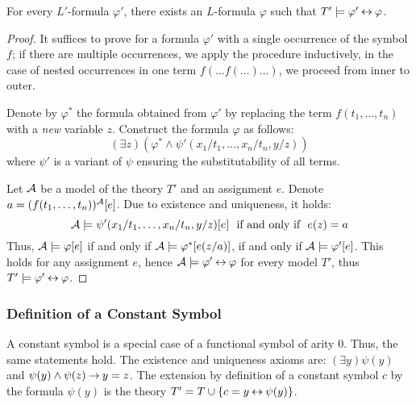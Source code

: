 \begin{proposition}
    For every $L'$-formula $\varphi'$, there exists an $L$-formula $\varphi$ such that $T'\models\varphi'\mathbin{\leftrightarrow}\varphi$.
\end{proposition}
\begin{proof}
    It suffices to prove for a formula $\varphi'$ with a single occurrence of the symbol $f$; if there are multiple occurrences, we apply the procedure inductively, in the case of nested occurrences in one term $f(\dots f(\dots)\dots)$, we proceed from inner to outer.

    Denote by $\varphi^*$ the formula obtained from $\varphi'$ by replacing the term $f(t_1,\dots,t_n)$ with a \emph{new} variable $z$. Construct the formula $\varphi$ as follows:
    $$
    (\exists z)(\varphi^*\land \psi'(x_1/t_1,\dots,x_n/t_n,y/z))
    $$
    where $\psi'$ is a variant of $\psi$ ensuring the substitutability of all terms.

    Let $\mathcal{A}$ be a model of the theory $T'$ and an assignment $e$. Denote $a=(f(t_1,\dots,t_n))^{\mathcal{A}}[e]$. Due to existence and uniqueness, it holds:
    $$
    \A\models\psi'(x_1/t_1,\dots,x_n/t_n,y/z)[e]\ \text{ if and only if }\ e(z)=a 
    $$
    Thus, $\mathcal{A}\models\varphi[e]$ if and only if $\mathcal{A}\models\varphi^*[e(z/a)]$, if and only if $\mathcal{A}\models\varphi'[e]$. This holds for any assignment $e$, hence $\mathcal{A}\models\varphi'\mathbin{\leftrightarrow}\varphi$ for every model $T'$, thus $T'\models\varphi'\mathbin{\leftrightarrow}\varphi$.
\end{proof}

\subsubsection*{Definition of a Constant Symbol}

A constant symbol is a special case of a functional symbol of arity 0. Thus, the same statements hold. The existence and uniqueness axioms are: $(\exists y)\psi(y)$ and $\psi(y)\land\psi(z)\mathbin{\rightarrow} y=z$. The extension by definition of a constant symbol $c$ by the formula $\psi(y)$ is the theory $T'=T\cup\{c=y\mathbin{\leftrightarrow} \psi(y)\}$.


